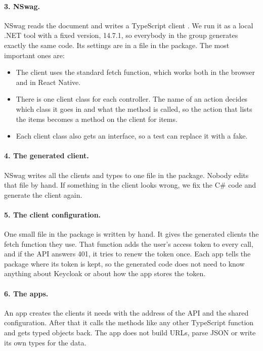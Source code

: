 \documentclass[a4paper,11pt]{article}
\begin{document}
\paragraph{3. NSwag.} NSwag reads the document and writes a TypeScript client \cite{nswag-typescript-client-generator}. We run it as a local .NET tool with a fixed version, 14.7.1, so everybody in the group generates exactly the same code. Its settings are in a file in the package. The most important ones are:
\begin{itemize}
  \item The client uses the standard fetch function, which works both in the browser and in React Native.
  \item There is one client class for each controller. The name of an action decides which class it goes in and what the method is called, so the action that lists the items becomes a method on the client for items.
  \item Each client class also gets an interface, so a test can replace it with a fake.
\end{itemize}

\paragraph{4. The generated client.} NSwag writes all the clients and types to one file in the package. Nobody edits that file by hand. If something in the client looks wrong, we fix the C\# code and generate the client again.

\paragraph{5. The client configuration.} One small file in the package is written by hand. It gives the generated clients the fetch function they use. That function adds the user's access token to every call, and if the API answers 401, it tries to renew the token once. Each app tells the package where its token is kept, so the generated code does not need to know anything about Keycloak or about how the app stores the token.

\paragraph{6. The apps.} An app creates the clients it needs with the address of the API and the shared configuration. After that it calls the methods like any other TypeScript function and gets typed objects back. The app does not build URLs, parse JSON or write its own types for the data.
\end{document}
